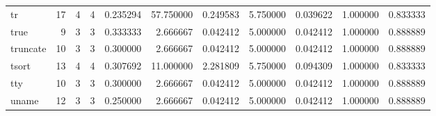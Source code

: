 \begin{tabular}{lrrrrrrrrrr}
tr        &                                      17 &                  4 &                                 4 &                                   0.235294 &                              57.750000 &                                     0.249583 &                          5.750000 &                                0.039622 &                           1.000000 &                                           0.833333 \\
true      &                                       9 &                  3 &                                 3 &                                   0.333333 &                               2.666667 &                                     0.042412 &                          5.000000 &                                0.042412 &                           1.000000 &                                           0.888889 \\
truncate  &                                      10 &                  3 &                                 3 &                                   0.300000 &                               2.666667 &                                     0.042412 &                          5.000000 &                                0.042412 &                           1.000000 &                                           0.888889 \\
tsort     &                                      13 &                  4 &                                 4 &                                   0.307692 &                              11.000000 &                                     2.281809 &                          5.750000 &                                0.094309 &                           1.000000 &                                           0.833333 \\
tty       &                                      10 &                  3 &                                 3 &                                   0.300000 &                               2.666667 &                                     0.042412 &                          5.000000 &                                0.042412 &                           1.000000 &                                           0.888889 \\
uname     &                                      12 &                  3 &                                 3 &                                   0.250000 &                               2.666667 &                                     0.042412 &                          5.000000 &                                0.042412 &                           1.000000 &                                           0.888889 \\

\end{tabular}
